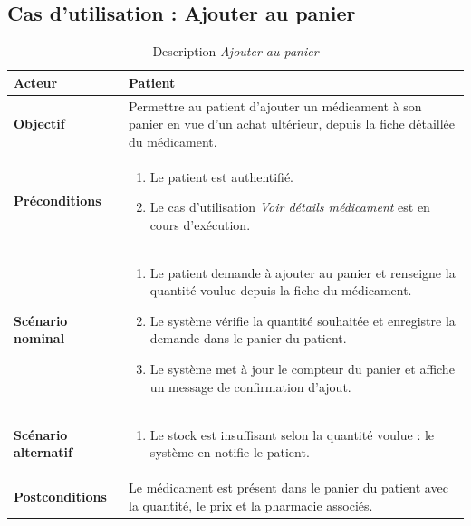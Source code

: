 \documentclass[12pt,a4paper]{report}
\begin{document}
\subsection*{Cas d'utilisation : Ajouter au panier}

\begin{table}[H]
    \centering
    \begin{tabular}{|p{4cm}|p{9cm}|}
        \hline
        \textbf{Acteur} & Patient \\
        \hline
        \textbf{Objectif} & Permettre au patient d'ajouter un médicament à son panier en vue d'un achat ultérieur, depuis la fiche détaillée du médicament. \\
        \hline
        \textbf{Préconditions} &
        \begin{enumerate}
            \item Le patient est authentifié.
            \item Le cas d'utilisation \textit{Voir détails médicament} est en cours d'exécution.
        \end{enumerate} \\
        \hline
        \textbf{Scénario nominal} &
        \begin{enumerate}
            \item Le patient demande à ajouter au panier et renseigne la quantité voulue depuis la fiche du médicament.
            \item Le système vérifie la quantité souhaitée et enregistre la demande dans le panier du patient.
            \item Le système met à jour le compteur du panier et affiche un message de confirmation d'ajout.
        \end{enumerate} \\
        \hline
        \textbf{Scénario alternatif} &
        \begin{enumerate}
            \item[2.a] Le stock est insuffisant selon la quantité voulue : le système en notifie le patient.
        \end{enumerate} \\
        \hline
        \textbf{Postconditions} & Le médicament est présent dans le panier du patient avec la quantité, le prix et la pharmacie associés. \\
        \hline
    \end{tabular}
    \caption{Description \textit{Ajouter au panier}}
\end{table}
\end{document}
